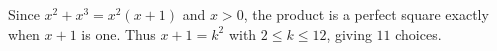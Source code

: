 Since $ x^2+x^3=x^2(x+1)$ and $ x>0 $, the product is a perfect square exactly when $ x+1 $ is one. Thus $ x+1=k^2 $ with $ 2\le k\le12 $, giving $\boxed{11}$ choices.
